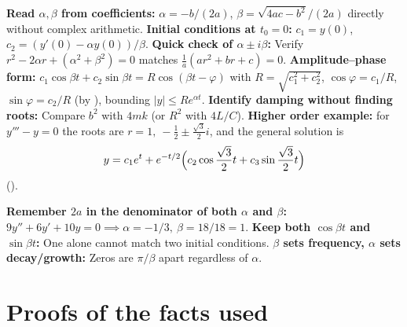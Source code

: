 \documentclass[10pt]{scrartcl}
\begin{document}
\begin{shortcuts}
  \ii \textbf{Read $\alpha,\beta$ from coefficients:} $\alpha=-b/(2a)$, $\beta=\sqrt{4ac-b^2}/(2a)$ directly without complex arithmetic.
  \ii \textbf{Initial conditions at $t_0=0$:} $c_1=y(0)$, $c_2=(y'(0)-\alpha y(0))/\beta$.
  \ii \textbf{Quick check of $\alpha\pm i\beta$:} Verify $r^2-2\alpha r+(\alpha^2+\beta^2)=0$ matches $\frac{1}{a}(ar^2+br+c)=0$.
  \ii \textbf{Amplitude--phase form:} $c_1\cos\beta t+c_2\sin\beta t=R\cos(\beta t-\varphi)$ with $R=\sqrt{c_1^2+c_2^2}$, $\cos\varphi=c_1/R$, $\sin\varphi=c_2/R$ (by ), bounding $|y|\le Re^{\alpha t}$.
  \ii \textbf{Identify damping without finding roots:} Compare $b^2$ with $4mk$ (or $R^2$ with $4L/C$).
  \ii \textbf{Higher order example:} for $y'''-y=0$ the roots are $r=1,\ -\frac12\pm\frac{\sqrt{3}}{2}i$, and the general solution is
  \[
    y=c_1e^t+e^{-t/2}\Bigl(c_2\cos\frac{\sqrt{3}}{2}t+c_3\sin\frac{\sqrt{3}}{2}t\Bigr)
  \]
  ().
\end{shortcuts}

\begin{trapbox}
  \ii \textbf{Remember $2a$ in the denominator of both $\alpha$ and $\beta$:} $9y''+6y'+10y=0\implies\alpha=-1/3,\ \beta=18/18=1$.
  \ii \textbf{Keep both $\cos\beta t$ and $\sin\beta t$:} One alone cannot match two initial conditions.
  \ii \textbf{$\beta$ sets frequency, $\alpha$ sets decay/growth:} Zeros are $\pi/\beta$ apart regardless of $\alpha$.
\end{trapbox}

\section{Proofs of the facts used}
\end{document}
